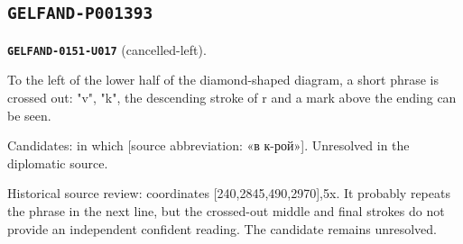\subsection*{\texttt{GELFAND-P001393}}
\par\noindent\leavevmode{}\label{GELFAND-0151-U017}\textbf{\texttt{GELFAND-0151-U017}} (cancelled-left).\nopagebreak[4]\par
To the left of the lower half of the diamond-shaped diagram, a short phrase is crossed out: "v", "k", the descending stroke of r and a mark above the ending can be seen.\par
Candidates: in which [source abbreviation: «в к-рой»]. Unresolved in the diplomatic source.\par
Historical source review: coordinates [240,2845,490,2970],5x. It probably repeats the phrase in the next line, but the crossed-out middle and final strokes do not provide an independent confident reading. The candidate remains unresolved.\par
\medskip
